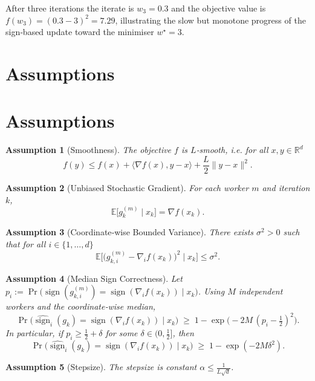\documentclass{article}
\newtheorem{assumption}{Assumption}
\newcommand{\sign}{\operatorname{sign}}
\newcommand{\E}{\mathbb{E}}
\newcommand{\R}{\mathbb{R}}
\begin{document}
After three iterations the iterate is $w_3=0.3$ and the objective value is
$f(w_3)=(0.3-3)^2=7.29$, illustrating the slow but monotone progress of the
sign‑based update toward the minimiser $w^{\star}=3$.

\section*{Assumptions}
\section{Assumptions}
\begin{assumption}[Smoothness]\label{as:smooth}
The objective $f$ is $L$‑smooth, i.e. for all $x,y\in\R^{d}$
\[
f(y)\le f(x)+\langle\nabla f(x),y-x\rangle+\frac{L}{2}\|y-x\|^{2}.
\]
\end{assumption}

\begin{assumption}[Unbiased Stochastic Gradient]\label{as:unbiased}
For each worker $m$ and iteration $k$,
\[
\E\big[g_k^{(m)}\mid x_k\big]=\nabla f(x_k).
\]
\end{assumption}

\begin{assumption}[Coordinate‑wise Bounded Variance]\label{as:var}
There exists $\sigma^{2}>0$ such that for all $i\in\{1,\dots,d\}$
\[
\E\!\Big[\big(g_{k,i}^{(m)}-\nabla_i f(x_k)\big)^{2}\mid x_k\Big]\le\sigma^{2}.
\]
\end{assumption}

\begin{assumption}[Median Sign Correctness]\label{as:median}
Let $p_i:=\Pr\!\big(\sign(g_{k,i}^{(m)})=\sign(\nabla_i f(x_k))\mid x_k\big)$.
Using $M$ independent workers and the coordinate‑wise median,
\[
\Pr\!\big(\widehat{\sign}_i(g_k)=\sign(\nabla_i f(x_k))\mid x_k\big)
\;\ge\;1-\exp\!\big(-2M\,(p_i-\tfrac12)^{2}\big).
\tag{3}
\]
In particular, if $p_i\ge \tfrac12+\delta$ for some $\delta\in(0,\tfrac12]$,
then
\[
\Pr\!\big(\widehat{\sign}_i(g_k)=\sign(\nabla_i f(x_k))\mid x_k\big)
\;\ge\;1-\exp(-2M\delta^{2}).
\tag{4}
\]
\end{assumption}

\begin{assumption}[Stepsize]\label{as:stepsize}
The stepsize is constant $\alpha\le \frac{1}{L\sqrt{d}}$.
\end{assumption}
\end{document}
